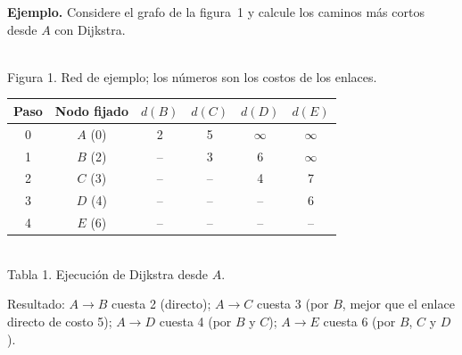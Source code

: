 \documentclass[12pt,letterpaper]{article}
\begin{document}
\textbf{Ejemplo.} Considere el grafo de la figura~1 y calcule los caminos más cortos desde $A$ con Dijkstra.
\begin{center}
\\[3pt]
{\footnotesize Figura 1. Red de ejemplo; los números son los costos de los enlaces.}
\end{center}
\begin{center}
\small
\begin{tabular}{|c|c|c|c|c|c|}
\hline
\textbf{Paso} & \textbf{Nodo fijado} & $d(B)$ & $d(C)$ & $d(D)$ & $d(E)$\\
\hline
0 & $A$ (0) & 2 & 5 & $\infty$ & $\infty$\\ \hline
1 & $B$ (2) & -- & 3 & 6 & $\infty$\\ \hline
2 & $C$ (3) & -- & -- & 4 & 7\\ \hline
3 & $D$ (4) & -- & -- & -- & 6\\ \hline
4 & $E$ (6) & -- & -- & -- & --\\ \hline
\end{tabular}\\[3pt]
{\footnotesize Tabla 1. Ejecución de Dijkstra desde $A$.}
\end{center}
Resultado: $A\to B$ cuesta 2 (directo); $A\to C$ cuesta 3 (por $B$, mejor que el enlace directo de costo 5); $A\to D$ cuesta 4 (por $B$ y $C$); $A\to E$ cuesta 6 (por $B$, $C$ y $D$).
\end{document}
